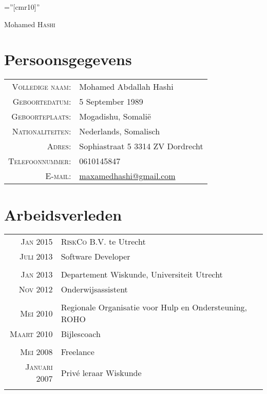 \documentclass[a4paper,10pt]{article}
\begin{document}
\pagestyle{empty} %

\font\fb=''[cmr10]'' %

\par{\centering
		{\Huge Mohamed \textsc{Hashi}
	}\bigskip\par}



\section{Persoonsgegevens}

\begin{tabular}{rl}
    \textsc{Volledige naam:} & Mohamed Abdallah Hashi\\
    \textsc{Geboortedatum:} & 5 September 1989 \\
    \textsc{Geboorteplaats:} & Mogadishu, Somali\"e  \\
    \textsc{Nationaliteiten:} & Nederlands, Somalisch \\
    \textsc{Adres:}   & Sophiastraat 5 3314 ZV Dordrecht\\
    \textsc{Telefoonnummer:}     & 0610145847\\
    \textsc{E-mail:}     & \href{mailto:maxamedhashi@gmail.com}{maxamedhashi@gmail.com}
\end{tabular}


\section{Arbeidsverleden}
\begin{tabular}{r|p{11cm}}
 \textsc{Jan 2015} & \textsc{RiskCo} B.V. te Utrecht \\
 \textsc{Juli 2013}& Software Developer\\
 \multicolumn{2}{c}{} \\
\textsc{Jan 2013} & Departement Wiskunde, Universiteit Utrecht \\
\textsc{Nov 2012} & Onderwijsassistent\\
 \multicolumn{2}{c}{} \\
 \textsc{Mei 2010} & Regionale Organisatie voor Hulp en Ondersteuning, ROHO \\
\textsc{Maart 2010} & Bijlescoach\\
 \multicolumn{2}{c}{} \\
 \textsc{Mei 2008} & Freelance \\
\textsc{Januari 2007} & Priv\'e leraar Wiskunde\\
 \multicolumn{2}{c}{} \\
\end{tabular}
\end{document}
